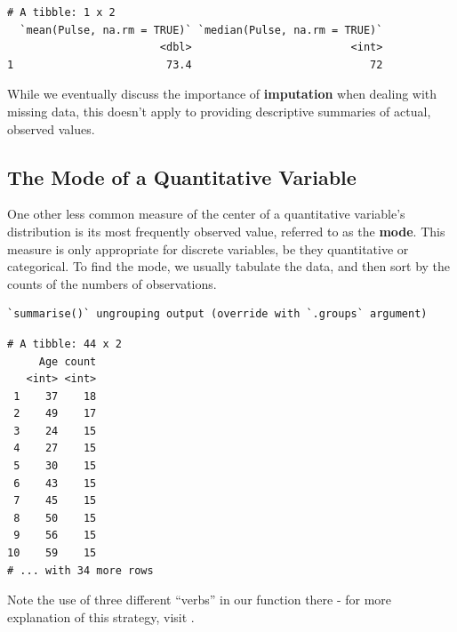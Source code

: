\documentclass[
]{book}
\newenvironment{Shaded}{\begin{snugshade}}{\end{snugshade}}
\newcommand{\DataTypeTok}[1]{\textcolor[rgb]{0.13,0.29,0.53}{#1}}
\newcommand{\KeywordTok}[1]{\textcolor[rgb]{0.13,0.29,0.53}{\textbf{#1}}}
\newcommand{\NormalTok}[1]{#1}
\newcommand{\OperatorTok}[1]{\textcolor[rgb]{0.81,0.36,0.00}{\textbf{#1}}}
\newcommand{\StringTok}[1]{\textcolor[rgb]{0.31,0.60,0.02}{#1}}
\begin{document}
\begin{verbatim}
# A tibble: 1 x 2
  `mean(Pulse, na.rm = TRUE)` `median(Pulse, na.rm = TRUE)`
                        <dbl>                         <int>
1                        73.4                            72
\end{verbatim}

While we eventually discuss the importance of \textbf{imputation} when dealing with missing data, this doesn't apply to providing descriptive summaries of actual, observed values.

\hypertarget{the-mode-of-a-quantitative-variable}{%
\subsection{The Mode of a Quantitative Variable}\label{the-mode-of-a-quantitative-variable}}

One other less common measure of the center of a quantitative variable's distribution is its most frequently observed value, referred to as the \textbf{mode}. This measure is only appropriate for discrete variables, be they quantitative or categorical. To find the mode, we usually tabulate the data, and then sort by the counts of the numbers of observations.

\begin{Shaded}
\end{Shaded}

\begin{verbatim}
`summarise()` ungrouping output (override with `.groups` argument)
\end{verbatim}

\begin{verbatim}
# A tibble: 44 x 2
     Age count
   <int> <int>
 1    37    18
 2    49    17
 3    24    15
 4    27    15
 5    30    15
 6    43    15
 7    45    15
 8    50    15
 9    56    15
10    59    15
# ... with 34 more rows
\end{verbatim}

Note the use of three different ``verbs'' in our function there - for more explanation of this strategy, visit \citet{R4DS}.
\end{document}
